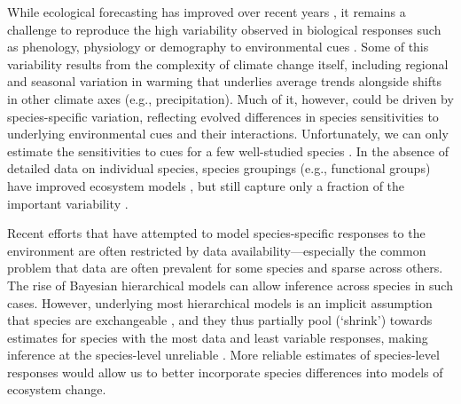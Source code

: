 \documentclass[11pt]{article}
\begin{document}
While ecological forecasting has improved over recent years \citep{dietze2017ecological,lewis2022power}, it remains a challenge to reproduce the high variability observed in biological responses such as phenology, physiology or demography to environmental cues \citep{IPCC:2014sm}. Some of this variability results from the complexity of climate change itself, including regional and seasonal variation in warming that underlies average trends alongside shifts in other climate axes (e.g.,  precipitation). Much of it, however, could be driven by species-specific variation, reflecting evolved differences in species sensitivities to underlying environmental cues and their interactions. Unfortunately, we can only estimate the sensitivities to cues for a few well-studied species \citep{chuinearees,ettinger2020}. In the absence of detailed data on individual species, species groupings (e.g., functional groups) have improved ecosystem models \citep{ed2001,griffith2020}, but still capture only a fraction of the important variability \citep{fuccillo2022}.%

Recent efforts that have attempted to model species-specific responses to the environment \citep{diez2012forecasting} are often restricted by data availability---especially the common problem that data are often prevalent for some species and sparse across others. The rise of Bayesian hierarchical models can allow inference across species in such cases. However, underlying most hierarchical models is an implicit assumption that species are exchangeable \citep[all species represent samples drawn from the same underlying distribution,][]{gelman2006}, and they thus partially pool (`shrink') towards estimates for species with the most data and least variable responses, making inference at the species-level unreliable \citep{ettinger2020}. More reliable estimates of species-level responses would allow us to better incorporate species differences into models of ecosystem change. 
\end{document}
